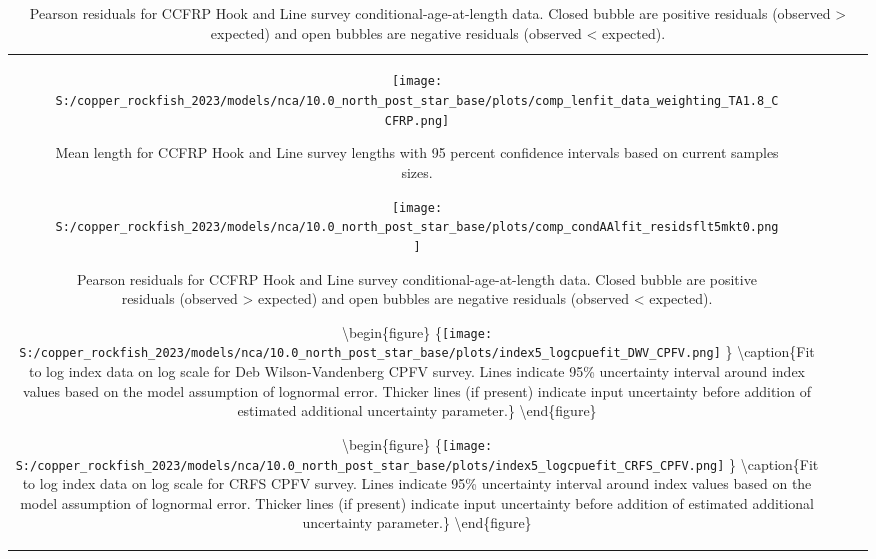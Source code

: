 \documentclass[11pt,
  letterpaper,
]{article}
\begin{document}
\begin{longtable}[t]{c>{\centering\arraybackslash}p{2cm}>{\centering\arraybackslash}p{2cm}>{\centering\arraybackslash}p{2cm}}
\begin{figure}
{\centering
\texttt{[image: S:/copper\_rockfish\_2023/models/nca/10.0\_north\_post\_star\_base/plots/comp\_lenfit\_data\_weighting\_TA1.8\_CCFRP.png]}
}
\caption{Mean length for CCFRP Hook and Line survey lengths with 95 percent confidence intervals based on current samples sizes.\label{fig:ccfrp-mean-len-fit}}
\end{figure}

\pagebreak

\begin{figure}
{\centering
\texttt{[image: S:/copper\_rockfish\_2023/models/nca/10.0\_north\_post\_star\_base/plots/comp\_condAAlfit\_residsflt5mkt0.png]}
}
\caption{Pearson residuals for CCFRP Hook and Line survey conditional-age-at-length data. Closed bubble are positive residuals (observed > expected) and open bubbles are negative residuals (observed < expected).\label{fig:ccfrp-age-pearson}}
\end{figure}

\pagebreak

\pagebreak

\pagebreak

\pagebreak

\textbackslash begin\{figure\} \{\centering \texttt{[image: S:/copper\_rockfish\_2023/models/nca/10.0\_north\_post\_star\_base/plots/index5\_logcpuefit\_DWV\_CPFV.png]} \} \textbackslash caption\{Fit to log index data on log scale for Deb Wilson-Vandenberg CPFV survey. Lines indicate 95\% uncertainty interval around index values based on the model assumption of lognormal error. Thicker lines (if present) indicate input uncertainty before addition of estimated additional uncertainty parameter.\label{fig:dwv-cpfv-index-fit}\} \textbackslash end\{figure\}

\pagebreak

\textbackslash begin\{figure\} \{\centering \texttt{[image: S:/copper\_rockfish\_2023/models/nca/10.0\_north\_post\_star\_base/plots/index5\_logcpuefit\_CRFS\_CPFV.png]} \} \textbackslash caption\{Fit to log index data on log scale for CRFS CPFV survey. Lines indicate 95\% uncertainty interval around index values based on the model assumption of lognormal error. Thicker lines (if present) indicate input uncertainty before addition of estimated additional uncertainty parameter.\label{fig:crfs-cpfv-index-fit}\} \textbackslash end\{figure\}


\end{longtable}
\end{document}
